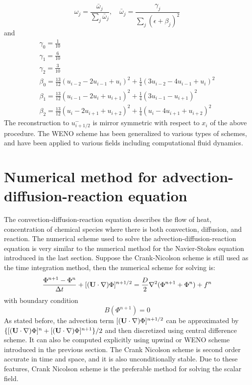 \begin{equation}
\omega_j = \frac{\bar{\omega}_j}{\sum_j\bar{\omega}_j}, \quad
\bar{\omega}_j = \frac{\gamma_j}{\sum_j(\epsilon + \beta_j)^2}
\end{equation}
and
\begin{eqnarray*}
\gamma_0 = \frac{1}{10}\\
\gamma_1 = \frac{6}{10}\\
\gamma_2 = \frac{3}{10}\\
\beta_0 = \frac{13}{12}(u_{i-2} - 2 u_{i-1} + u_i)^2 + \frac{1}{4}(3u_{i-2} - 4u_{i-1} + u_i)^2 \\
\beta_1 = \frac{13}{12}(u_{i-1} - 2u_i + u_{i+1})^2 + \frac{1}{4}(3u_{i-1} - u_{i+1})^2\\
\beta_2 = \frac{13}{12}(u_i - 2u_{i+1} + u_{i+2})^2 + \frac{1}{4}(u_i - 4u_{i+1} + u_{i+2})^2
\end{eqnarray*}
The reconstruction to $u_{i+1/2}^-$ is mirror symmetric with respect to $x_i$ of the above procedure. The WENO scheme has been generalized to various types of schemes, and have been applied to various fields including computational fluid dynamics.

\section{Numerical method for advection-diffusion-reaction equation}
The convection-diffusion-reaction equation describes the flow of heat, concentration of chemical species where there is both convection, diffusion, and reaction. The numerical scheme used to solve the advection-diffusion-reaction equation is very similar to the numerical method for the Navier-Stokes equation introduced in the last section. Suppose the Crank-Nicolson scheme is still used as the time integration method, then the numerical scheme for solving  is:
\begin{equation}
\frac{\Phi^{n+1}-\Phi^n}{\Delta t} + [(\mathbf{U}\cdot\nabla)\Phi]^{n+1/2} = \frac{D}{2}\nabla^2(\Phi^{n+1} + \Phi^n) + f^n
\label{phi_disc_eqn}
\end{equation}
with boundary condition
\begin{equation}
B(\Phi^{n+1}) = 0
\label{phi_bc}
\end{equation}
As stated before, the advection term $[(\mathbf{U}\cdot\nabla)\Phi]^{n+1/2}$ can be approximated by $\{[(\mathbf{U}\cdot \nabla)\Phi]^n + [(\mathbf{U}\cdot \nabla)\Phi]^{n+1}\}/2$ and then discretized using central difference scheme. It can also be computed explicitly using upwind or WENO scheme introduced in the previous section. The Crank Nicolson scheme is second order accurate in time and space, and it is also unconditionally stable. Due to these features, Crank Nicolson scheme is the preferable method for solving the scalar field.

